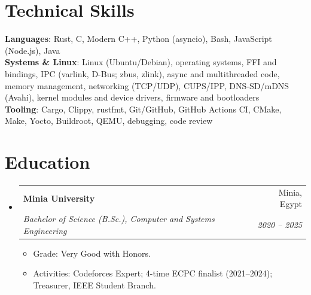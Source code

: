 \documentclass[letterpaper,11pt]{article}
\makeatletter
\newcommand{\resumeItem}[1]{
  \item\small{
    {#1 \vspace{-2pt}}
  }
}
\newcommand{\resumeSubheading}[4]{
  \vspace{-2pt}\item
    \begin{tabular*}{0.97\textwidth}[t]{l@{\extracolsep{\fill}}r}
      \textbf{#1} & #2 \\
      \textit{\small#3} & \textit{\small #4} \\
    \end{tabular*}\vspace{-7pt}
}
\newcommand{\resumeSubHeadingListStart}{\begin{itemize}[leftmargin=0.15in, label={}]}
\newcommand{\resumeSubHeadingListEnd}{\end{itemize}}
\newcommand{\resumeItemListStart}{\begin{itemize}}
\newcommand{\resumeItemListEnd}{\end{itemize}\vspace{-5pt}}
\makeatother
\begin{document}
%
\section{Technical Skills}
 \begin{itemize}[leftmargin=0.15in, label={}]
    \small{\item{
     \textbf{Languages}{: Rust, C, Modern C++, Python (asyncio), Bash, JavaScript (Node.js), Java} \\
     \textbf{Systems \& Linux}{: Linux (Ubuntu/Debian), operating systems, FFI and bindings, IPC (varlink, D-Bus; zbus, zlink), async and multithreaded code, memory management, networking (TCP/UDP), CUPS/IPP, DNS-SD/mDNS (Avahi), kernel modules and device drivers, firmware and bootloaders} \\
     \textbf{Tooling}{: Cargo, Clippy, rustfmt, Git/GitHub, GitHub Actions CI, CMake, Make, Yocto, Buildroot, QEMU, debugging, code review}
    }}
 \end{itemize}

\section{Education}
  \resumeSubHeadingListStart
    \resumeSubheading
      {Minia University}{Minia, Egypt}
      {Bachelor of Science (B.Sc.), Computer and Systems Engineering}{2020 -- 2025}
      \resumeItemListStart
        \resumeItem{Grade: Very Good with Honors.}
        \resumeItem{Activities: Codeforces Expert; 4-time ECPC finalist (2021--2024); Treasurer, IEEE Student Branch.}
      \resumeItemListEnd
  \resumeSubHeadingListEnd


\end{document}
